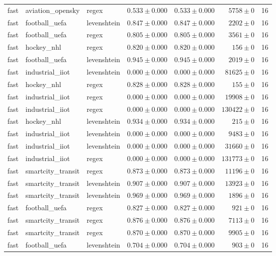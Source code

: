 \begin{table}[htbp]
\begin{tabular}{l l l r r r r}
fast & aviation\_opensky & regex & $0.533\pm0.000$ & $0.533\pm0.000$ & $5758\pm0$ & 16 \\
fast & football\_uefa & levenshtein & $0.847\pm0.000$ & $0.847\pm0.000$ & $2202\pm0$ & 16 \\
fast & football\_uefa & regex & $0.805\pm0.000$ & $0.805\pm0.000$ & $3561\pm0$ & 16 \\
fast & hockey\_nhl & regex & $0.820\pm0.000$ & $0.820\pm0.000$ & $156\pm0$ & 16 \\
fast & football\_uefa & levenshtein & $0.945\pm0.000$ & $0.945\pm0.000$ & $2019\pm0$ & 16 \\
fast & industrial\_iiot & levenshtein & $0.000\pm0.000$ & $0.000\pm0.000$ & $81625\pm0$ & 16 \\
fast & hockey\_nhl & regex & $0.828\pm0.000$ & $0.828\pm0.000$ & $155\pm0$ & 16 \\
fast & industrial\_iiot & regex & $0.000\pm0.000$ & $0.000\pm0.000$ & $19908\pm0$ & 16 \\
fast & industrial\_iiot & regex & $0.000\pm0.000$ & $0.000\pm0.000$ & $130422\pm0$ & 16 \\
fast & hockey\_nhl & levenshtein & $0.934\pm0.000$ & $0.934\pm0.000$ & $215\pm0$ & 16 \\
fast & industrial\_iiot & levenshtein & $0.000\pm0.000$ & $0.000\pm0.000$ & $9483\pm0$ & 16 \\
fast & industrial\_iiot & levenshtein & $0.000\pm0.000$ & $0.000\pm0.000$ & $31660\pm0$ & 16 \\
fast & industrial\_iiot & regex & $0.000\pm0.000$ & $0.000\pm0.000$ & $131773\pm0$ & 16 \\
fast & smartcity\_transit & regex & $0.873\pm0.000$ & $0.873\pm0.000$ & $11196\pm0$ & 16 \\
fast & smartcity\_transit & levenshtein & $0.907\pm0.000$ & $0.907\pm0.000$ & $13923\pm0$ & 16 \\
fast & smartcity\_transit & levenshtein & $0.969\pm0.000$ & $0.969\pm0.000$ & $1896\pm0$ & 16 \\
fast & football\_uefa & regex & $0.827\pm0.000$ & $0.827\pm0.000$ & $921\pm0$ & 16 \\
fast & smartcity\_transit & regex & $0.876\pm0.000$ & $0.876\pm0.000$ & $7113\pm0$ & 16 \\
fast & smartcity\_transit & regex & $0.870\pm0.000$ & $0.870\pm0.000$ & $9905\pm0$ & 16 \\
fast & football\_uefa & levenshtein & $0.704\pm0.000$ & $0.704\pm0.000$ & $903\pm0$ & 16 \\

\end{tabular}
\end{table}
